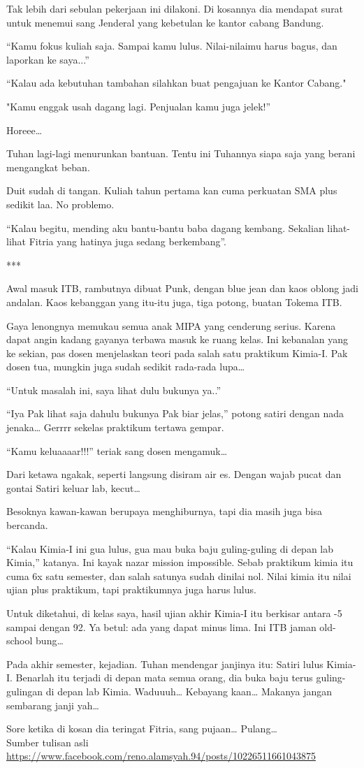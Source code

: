 Tak lebih dari sebulan pekerjaan ini dilakoni. Di kosannya dia mendapat surat untuk menemui sang Jenderal yang kebetulan ke kantor cabang Bandung.

“Kamu fokus kuliah saja. Sampai kamu lulus. Nilai-nilaimu harus bagus, dan laporkan ke saya...”

“Kalau ada kebutuhan tambahan silahkan buat pengajuan ke Kantor Cabang."

"Kamu enggak usah dagang lagi. Penjualan kamu juga jelek!”

Horeee…

Tuhan lagi-lagi menurunkan bantuan. Tentu ini Tuhannya siapa saja yang berani mengangkat beban.

Duit sudah di tangan. Kuliah tahun pertama kan cuma perkuatan SMA plus sedikit laa. No problemo.

“Kalau begitu, mending aku bantu-bantu baba dagang kembang. Sekalian lihat-lihat Fitria yang hatinya juga sedang berkembang”.

***

Awal masuk ITB, rambutnya dibuat Punk, dengan blue jean dan kaos oblong jadi andalan. Kaos kebanggan yang itu-itu juga, tiga potong, buatan Tokema ITB.

Gaya lenongnya memukau semua anak MIPA yang cenderung serius. Karena dapat angin kadang gayanya terbawa masuk ke ruang kelas. Ini kebanalan yang ke sekian, pas dosen menjelaskan teori pada salah satu praktikum Kimia-I. Pak dosen tua, mungkin juga sudah sedikit rada-rada lupa…

“Untuk masalah ini, saya lihat dulu bukunya ya..”

“Iya Pak lihat saja dahulu bukunya Pak biar jelas,” potong satiri dengan nada jenaka… Gerrrr sekelas praktikum tertawa gempar.

“Kamu keluaaaar!!!” teriak sang dosen mengamuk…

Dari ketawa ngakak, seperti langsung disiram air es. Dengan wajab pucat dan gontai Satiri keluar lab, kecut…

Besoknya kawan-kawan berupaya menghiburnya, tapi dia masih juga bisa bercanda.

“Kalau Kimia-I ini gua lulus, gua mau buka baju guling-guling di depan lab Kimia,” katanya. Ini kayak nazar mission impossible. Sebab praktikum kimia itu cuma 6x satu semester, dan salah satunya sudah dinilai nol. Nilai kimia itu nilai ujian plus praktikum, tapi praktikumnya juga harus lulus.

Untuk diketahui, di kelas saya, hasil ujian akhir Kimia-I itu berkisar antara -5 sampai dengan 92. Ya betul: ada yang dapat minus lima. Ini ITB jaman old-school bung…

Pada akhir semester, kejadian. Tuhan mendengar janjinya itu: Satiri lulus Kimia-I. Benarlah itu terjadi di depan mata semua orang, dia buka baju terus guling-gulingan di depan lab Kimia. Waduuuh… Kebayang kaan… Makanya jangan sembarang janji yah…

Sore ketika di kosan dia teringat Fitria, sang pujaan… Pulang…
\\[10pt]

Sumber tulisan asli \url{https://www.facebook.com/reno.alamsyah.94/posts/10226511661043875}

